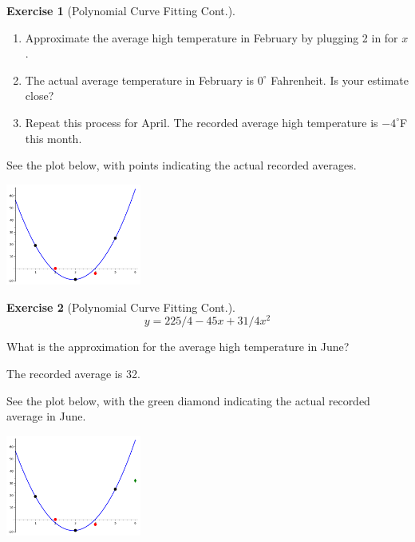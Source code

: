 \documentclass[handout]{beamer}
\theoremstyle{definition}
\newtheorem{exercise}{Exercise}
\begin{document}
\begin{frame}{\insertframenumber}
\begin{exercise}[Polynomial Curve Fitting Cont.]
\begin{enumerate}[label=(\alph*)]
	\item Approximate the average high temperature in February by plugging 2 in for $x$.
	\item The actual average temperature in February is $0^{\circ }$ Fahrenheit. Is your estimate close?
	\item Repeat this process for April.  The recorded average high temperature is $-4^{\circ }$F this month.
\end{enumerate}
\pause
See the plot below, with points indicating the actual recorded averages.
\begin{center}
	\includegraphics[width=1.75in]{images/mars_curve2}
\end{center}
\end{exercise}
\end{frame}

\begin{frame}{\insertframenumber}
\begin{exercise}[Polynomial Curve Fitting Cont.]
\[y=225/4-45x+31/4x^2\]

What is the approximation for the average high temperature in June?
\pause

The recorded average is 32.

See the plot below, with the green diamond indicating the actual recorded average in June.
\begin{center}
	\includegraphics[width=1.75in]{images/mars_curve3}
\end{center}
\end{exercise}
\end{frame}
\end{document}
